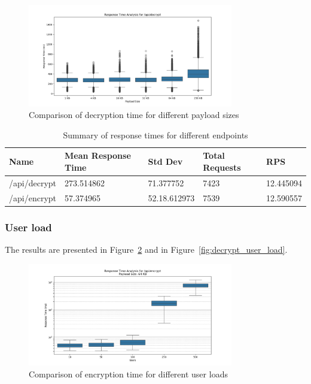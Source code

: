 \documentclass[cic,tc,english]{iiufrgs}
\begin{document}
                \begin{figure}
                    \centering
                    \includegraphics[width=0.8\textwidth]{images/phase2/response_time_api_decrypt.png}
                    \caption{Comparison of decryption time for different payload sizes}
                    \label{fig:decrypt_payload_size}
                \end{figure}

                \begin{table}[!ht]
                    \centering
                    \begin{tabular}{|l|l|l|l|l|}
                    \hline
                        Name & Mean Response Time &  Std Dev & Total Requests & RPS \\ \hline
                        /api/decrypt & 273.514862 & 71.377752 & 7423 & 12.445094 \\ \hline
                        /api/encrypt & 57.374965 & 52.18.612973 & 7539 & 12.590557 \\ \hline
                    \end{tabular}
                    \caption{Summary of response times for different endpoints}
                    \label{tab:response_times}
                \end{table}

            \subsubsection{User load}
                The results are presented in Figure~\ref{fig:encrypt_user_load} and in Figure~\ref{fig:decrypt_user_load}.

                \begin{figure}
                    \centering
                    \includegraphics[width=0.8\textwidth]{images/phase3/response_time_api_encrypt_64KB.png}
                    \caption{Comparison of encryption time for different user loads}
                    \label{fig:encrypt_user_load}
                \end{figure}
\end{document}
